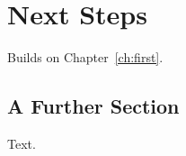 \chapter{Next Steps}
\label{ch:second}
Builds on Chapter~\ref{ch:first}.

\section{A Further Section}
Text.
